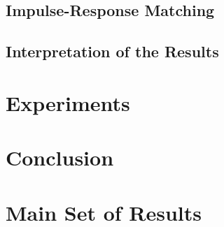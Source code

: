 \documentclass[12pt]{article}
\begin{document}
\subsection{Impulse-Response Matching}\label{section:IRmatching}

\subsection{Interpretation of the Results}\label{section:Interpretation_theory}





\section{Experiments}\label{section:experiments}




\section{Conclusion}\label{section:conclusions}






\newpage


\appendix 

\section{Main Set of Results}\label{section:mainSetResults}
\end{document}

